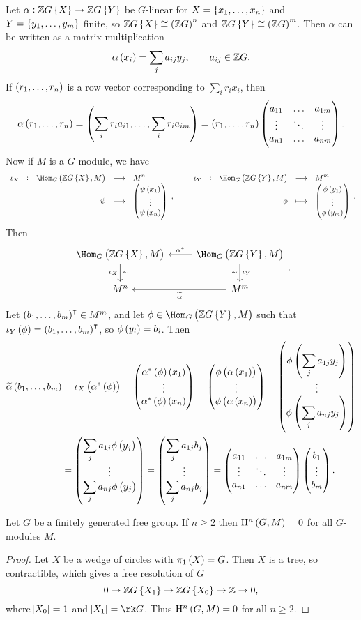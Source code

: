 Let $ \alpha : \ZZ G\cbr{X} \to \ZZ G\cbr{Y} $ be $ G $-linear for $ X = \cbr{x_1, \dots, x_n} $ and $ Y = \cbr{y_1, \dots, y_m} $ finite, so $ \ZZ G\cbr{X} \cong \br{\ZZ G}^n $ and $ \ZZ G\cbr{Y} \cong \br{\ZZ G}^m $. Then $ \alpha $ can be written as a matrix multiplication
$$ \alpha\br{x_i} = \sum_j a_{ij}y_j, \qquad a_{ij} \in \ZZ G. $$
If $ \br{r_1, \dots, r_n} $ is a row vector corresponding to $ \sum_i r_ix_i $, then
$$ \alpha\br{r_1, \dots, r_n} = \br{\sum_i r_ia_{i1}, \dots, \sum_i r_ia_{im}} = \br{r_1, \dots, r_n}\threebythree{a_{11}}{\dots}{a_{1m}}{\vdots}{\ddots}{\vdots}{a_{n1}}{\dots}{a_{nm}}. $$
Now if $ M $ is a $ G $-module, we have
$$ \function[\iota_X]{\Hom_G\br{\ZZ G\cbr{X}, M}}{M^n}{\psi}{\threebyone{\psi\br{x_1}}{\vdots}{\psi\br{x_n}}}, \qquad \function[\iota_Y]{\Hom_G\br{\ZZ G\cbr{Y}, M}}{M^m}{\phi}{\threebyone{\phi\br{y_1}}{\vdots}{\phi\br{y_m}}}. $$
Then
$$
\begin{tikzcd}
\Hom_G\br{\ZZ G\cbr{X}, M} \arrow{d}{\sim}[swap]{\iota_X} & \Hom_G\br{\ZZ G\cbr{Y}, M} \arrow{l}[swap]{\alpha^*} \arrow{d}{\iota_Y}[swap]{\sim} \\
M^n & M^m \arrow{l}{\widetilde{\alpha}}
\end{tikzcd}.
$$
Let $ \br{b_1, \dots, b_m}^\intercal \in M^m $, and let $ \phi \in \Hom_G\br{\ZZ G\cbr{Y}, M} $ such that $ \iota_Y\br{\phi} = \br{b_1, \dots, b_m}^\intercal $, so $ \phi\br{y_i} = b_i $. Then
\begin{align*}
\widetilde{\alpha}\br{b_1, \dots, b_m}
& = \iota_X\br{\alpha^*\br{\phi}}
= \threebyone{\alpha^*\br{\phi}\br{x_1}}{\vdots}{\alpha^*\br{\phi}\br{x_n}}
= \threebyone{\phi\br{\alpha\br{x_1}}}{\vdots}{\phi\br{\alpha\br{x_n}}}
= \threebyone{\phi\br{\displaystyle\sum_j a_{1j}y_j}}{\vdots}{\phi\br{\displaystyle\sum_j a_{nj}y_j}} \\
& = \threebyone{\displaystyle\sum_j a_{1j}\phi\br{y_j}}{\vdots}{\displaystyle\sum_j a_{nj}\phi\br{y_j}}
= \threebyone{\displaystyle\sum_j a_{1j}b_j}{\vdots}{\displaystyle\sum_j a_{nj}b_j}
= \threebythree{a_{11}}{\dots}{a_{1m}}{\vdots}{\ddots}{\vdots}{a_{n1}}{\dots}{a_{nm}}\threebyone{b_1}{\vdots}{b_m}.
\end{align*}

\pagebreak

\begin{proposition}
Let $ G $ be a finitely generated free group. If $ n \ge 2 $ then $ \H^n\br{G, M} = 0 $ for all $ G $-modules $ M $.
\end{proposition}

\begin{proof}
Let $ X $ be a wedge of circles with $ \pi_1\br{X} = G $. Then $ \widetilde{X} $ is a tree, so contractible, which gives a free resolution of $ G $
$$ 0 \to \ZZ G\cbr{X_1} \to \ZZ G\cbr{X_0} \to \ZZ \to 0, $$
where $ \abs{X_0} = 1 $ and $ \abs{X_1} = \rk G $. Thus $ \H^n\br{G, M} = 0 $ for all $ n \ge 2 $.
\end{proof}


